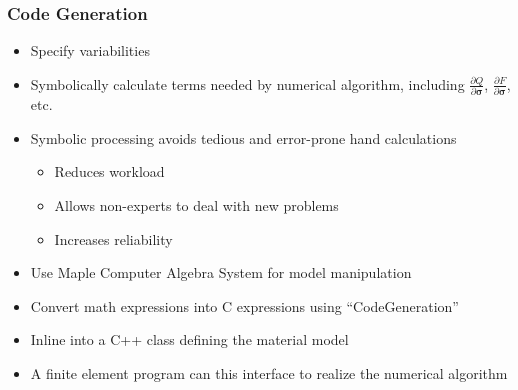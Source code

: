 \documentclass[t,12pt,numbers,fleqn]{beamer}
\begin{document}
\begin{frame}

\frametitle{Code Generation}

\begin{itemize}
\item Specify variabilities
\item Symbolically calculate terms needed by numerical algorithm, including $\frac{ \partial Q}{ \partial
\bm{\sigma}}$, $\frac{\partial F}{\partial \bm{\sigma}}$, etc.
\item Symbolic processing avoids tedious and error-prone hand calculations
\begin{itemize}
\item Reduces workload
\item Allows non-experts to deal with new problems
\item Increases reliability
\end{itemize}
\item Use Maple Computer Algebra System for model manipulation
\item Convert math expressions into C expressions using ``CodeGeneration''
\item Inline into a C++ class defining the material model
\item A finite element program can this interface to realize the numerical algorithm
\end{itemize}

\end{frame}

\end{document}
